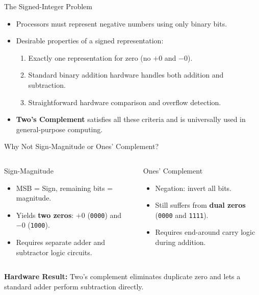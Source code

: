 \documentclass[aspectratio=169,11pt]{beamer}
\newcommand{\key}[1]{\textbf{#1}}
\newcommand{\bits}[1]{\texttt{#1}}
\begin{document}

\begin{frame}{The Signed-Integer Problem}

\begin{itemize}
  \item Processors must represent negative numbers using only binary bits.
  \item Desirable properties of a signed representation:
  \begin{enumerate}
    \item Exactly one representation for zero (no $+0$ and $-0$).
    \item Standard binary addition hardware handles both addition and subtraction.
    \item Straightforward hardware comparison and overflow detection.
  \end{enumerate}
  \item \key{Two's Complement} satisfies all these criteria and is universally used in general-purpose computing.
\end{itemize}

\end{frame}


\begin{frame}{Why Not Sign-Magnitude or Ones' Complement?}

\begin{columns}[T,onlytextwidth]

\begin{block}{Sign-Magnitude}
\begin{itemize}
  \item MSB = Sign, remaining bits = magnitude.
  \item Yields \key{two zeros}: $+0$ (\bits{0000}) and $-0$ (\bits{1000}).
  \item Requires separate adder and subtractor logic circuits.
\end{itemize}
\end{block}

\begin{block}{Ones' Complement}
\begin{itemize}
  \item Negation: invert all bits.
  \item Still suffers from \key{dual zeros} (\bits{0000} and \bits{1111}).
  \item Requires end-around carry logic during addition.
\end{itemize}
\end{block}

\end{columns}

\vspace{0.6em}
\key{Hardware Result:} Two's complement eliminates duplicate zero and lets a standard adder perform subtraction directly.

\end{frame}
\end{document}
